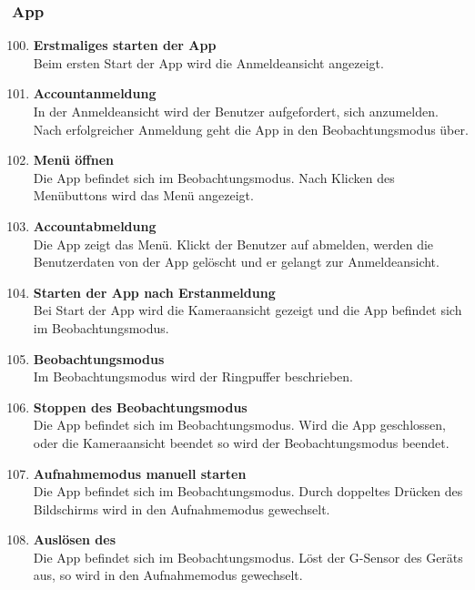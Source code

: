 \subsubsection{\gls{App}}
\begin{enumerate}[\bfseries{TK}10]  
\setcounter{enumi}{99}{}

\item \textbf{Erstmaliges starten der \gls{App}} \hfill\\  
Beim ersten Start der App wird die Anmeldeansicht angezeigt.

\item \textbf{Accountanmeldung} \hfill\\  
In der Anmeldeansicht wird der Benutzer aufgefordert, sich anzumelden. Nach erfolgreicher Anmeldung geht die \gls{App} in den Beobachtungsmodus \"uber.

\item \textbf{Men\"u \"offnen} \hfill\\
Die \gls{App} befindet sich im Beobachtungsmodus. Nach Klicken des Men\"ubuttons wird das Men\"u angezeigt.

\item \textbf{Accountabmeldung} \hfill\\  
Die App zeigt das Men\"u. Klickt der Benutzer auf abmelden, werden die Benutzerdaten von der App gelöscht und er gelangt zur Anmeldeansicht.

\item \textbf{Starten der \gls{App} nach Erstanmeldung} \hfill\\  
Bei Start der App wird die Kameraansicht gezeigt und die App befindet sich im Beobachtungsmodus.

\item \textbf{Beobachtungsmodus} \hfill\\
Im Beobachtungsmodus wird der \gls{Ringpuffer} beschrieben.

\item \textbf{Stoppen des Beobachtungsmodus} \hfill\\  
Die \gls{App} befindet sich im Beobachtungsmodus. Wird die App geschlossen, oder die Kameraansicht beendet so wird der Beobachtungsmodus beendet.

\item \textbf{Aufnahmemodus manuell starten} \hfill\\
Die \gls{App} befindet sich im Beobachtungsmodus. Durch doppeltes Dr\"ucken des Bildschirms wird in den Aufnahmemodus gewechselt. 

\item \textbf{Ausl\"osen des } \hfill\\  
Die \gls{App} befindet sich im Beobachtungsmodus. Löst der \gls{G-Sensor} des Ger\"ats aus, so wird in den Aufnahmemodus gewechselt.


\end{enumerate}
